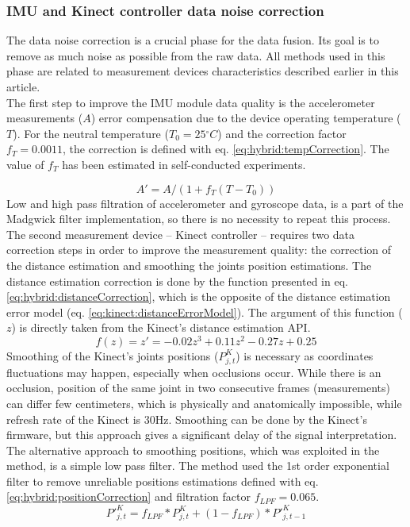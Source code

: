 \documentclass[sensors,article,submit,moreauthors,pdftex,10pt,a4paper]{mdpi}
\newcommand{\degree}{\ensuremath{{}^{\circ}}\xspace}
\begin{document}
\subsubsection{IMU and Kinect controller data noise correction}
The data noise correction is a crucial phase for the data fusion. Its goal is to remove as much noise as possible from the raw data. All methods used in this phase are related to measurement devices characteristics described earlier in this article.\\
The first step to improve the IMU module data quality is the accelerometer measurements ($A$) error compensation due to the device operating temperature ($T$). For the neutral temperature ($T_0=25\degree C$) and the correction factor $f_T= 0.0011$, the correction is defined with eq. \ref{eq:hybrid:tempCorrection}. The value of $f_T$ has been estimated in self-conducted experiments.
		
\begin{equation}
	A'=A/(1+ f_T (T-T_0))
	\label{eq:hybrid:tempCorrection}
\end{equation}
Low and high pass filtration of accelerometer and gyroscope data, is a part of the Madgwick filter implementation, so there is no necessity to repeat this process.
The second measurement device – Kinect controller – requires two data correction steps in order to improve the measurement quality: the correction of the distance estimation and smoothing the joints position estimations. The distance estimation correction is done by the function presented in eq. \ref{eq:hybrid:distanceCorrection}, which is the opposite of the distance estimation error model (eq. \ref{eq:kinect:distanceErrorModel}). The argument of this function ($z$) is directly taken from the Kinect’s distance estimation API.
\begin{equation}
	f(z)=z'=-0.02z^3+0.11z^2-0.27z+0.25
	\label{eq:hybrid:distanceCorrection}
\end{equation}
Smoothing of the Kinect’s joints positions ($P_{j,t}^K$) is necessary as coordinates fluctuations may happen, especially when occlusions occur. While there is an occlusion, position of the same joint in two consecutive frames (measurements) can differ few centimeters, which is physically and anatomically impossible, while refresh rate of the Kinect is 30Hz. Smoothing can be done by the Kinect’s firmware, but this approach gives a significant delay of the signal interpretation. The alternative approach to smoothing positions, which was exploited in the method, is a simple low pass filter. The method used the 1st order exponential filter to remove unreliable positions estimations defined with eq. \ref{eq:hybrid:positionCorrection} and filtration factor $f_{LPF} = 0.065$.
\begin{equation}
	{P'}_{j,t}^K=f_{LPF} * P_{j,t}^K+(1-f_{LPF}) * {P'}_{j,t-1}^K
	\label{eq:hybrid:positionCorrection}
\end{equation}
		
\end{document}

